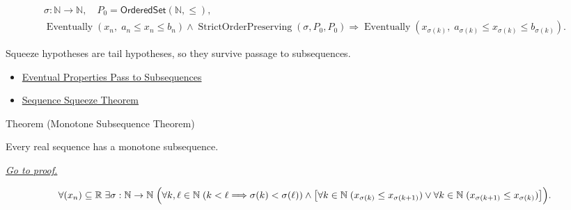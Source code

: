 \begin{remark*}
\[
\begin{gathered}
\sigma\colon\mathbb{N}\to\mathbb{N},\quad
P_0=\mathsf{OrderedSet}(\mathbb{N},\leq),\\
\operatorname{Eventually}(x_n,\;a_n\le x_n\le b_n)
\land
\operatorname{StrictOrderPreserving}(\sigma,P_0,P_0)
\Longrightarrow
\operatorname{Eventually}(x_{\sigma(k)},\;a_{\sigma(k)}\le x_{\sigma(k)}\le b_{\sigma(k)}).
\end{gathered}
\]
\end{remark*}

\begin{remark*}[Interpretation]
Squeeze hypotheses are tail hypotheses, so they survive passage to
subsequences.
\end{remark*}

\begin{dependencies}
\begin{itemize}
  \item \hyperref[thm:eventual-properties-pass-to-subsequences]{Eventual Properties Pass to Subsequences}
  \item \hyperref[thm:sequence-squeeze-theorem]{Sequence Squeeze Theorem}
\end{itemize}
\end{dependencies}


\begin{theorembox}{Theorem (Monotone Subsequence Theorem)}
\begin{theorem}
\label{thm:monotone-subsequence-theorem}
Every real sequence has a monotone subsequence.

\smallskip
\noindent
\hyperref[prf:monotone-subsequence-theorem]{\textit{Go to proof.}}
\end{theorem}
\end{theorembox}

\begin{remark*}
\[
\forall (x_n)\subseteq\mathbb{R}\;\exists \sigma:\mathbb{N}\to\mathbb{N}\;
\Bigl(
  \forall k,\ell\in\mathbb{N}\;(k<\ell\Longrightarrow\sigma(k)<\sigma(\ell))
  \land
  \bigl[
    \forall k\in\mathbb{N}\;(x_{\sigma(k)}\le x_{\sigma(k+1)})
    \lor
    \forall k\in\mathbb{N}\;(x_{\sigma(k+1)}\le x_{\sigma(k)})
  \bigr]
\Bigr).
\]
\end{remark*}

